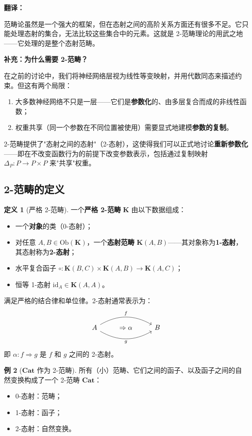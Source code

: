 \documentclass[12pt,a4paper]{ctexart}
\theoremstyle{definition}
\newtheorem{definition}{定义}[section]
\newtheorem{example}[definition]{例}
\newcommand{\cat}[1]{\mathbf{#1}}
\newcommand{\Cat}{\cat{Cat}}
\newcommand{\id}{\mathrm{id}}
\newcommand{\ob}[1]{\mathrm{Ob}(#1)}
\begin{document}
\textbf{翻译：}

范畴论虽然是一个强大的框架，但在态射之间的高阶关系方面还有很多不足。它只能处理态射的集合，无法比较这些集合中的元素。这就是 2-范畴理论的用武之地——它处理的是整个态射范畴。

\textbf{补充：为什么需要 2-范畴？}

在之前的讨论中，我们将神经网络层视为线性等变映射，并用代数同态来描述约束。但这有两个局限：
\begin{enumerate}[nosep]
    \item 大多数神经网络不只是一层——它们是\textbf{参数化}的、由多层复合而成的非线性函数；
    \item 权重共享（同一个参数在不同位置被使用）需要显式地建模\textbf{参数的复制}。
\end{enumerate}
2-范畴提供了"态射之间的态射"（2-态射），这使得我们可以正式地讨论\textbf{重新参数化}——即在不改变函数行为的前提下改变参数表示，包括通过复制映射 $\Delta_P:P\to P\times P$ 来"共享"权重。

\subsection{2-范畴的定义}

\begin{definition}[严格 2-范畴]\label{def:2-category}
一个\textbf{严格 2-范畴} $\cat K$ 由以下数据组成：
\begin{itemize}[nosep]
    \item 一个\textbf{对象}的类（0-态射）；
    \item 对任意 $A,B\in\ob{\cat K}$，一个\textbf{态射范畴} $\cat K(A,B)$——其对象称为\textbf{1-态射}，其态射称为\textbf{2-态射}；
    \item 水平复合函子 $\circ:\cat K(B,C)\times\cat K(A,B)\to\cat K(A,C)$；
    \item 恒等 1-态射 $\id_A\in\cat K(A,A)$。
\end{itemize}
满足严格的结合律和单位律。2-态射通常表示为：
\[
\begin{tikzcd}
A \arrow[rr,bend left,"f"] \arrow[rr,bend right,"g"'] & \Rightarrow\alpha & B
\end{tikzcd}
\]
即 $\alpha:f\Rightarrow g$ 是 $f$ 和 $g$ 之间的 2-态射。
\end{definition}

\begin{example}[$\Cat$ 作为 2-范畴]
所有（小）范畴、它们之间的函子、以及函子之间的自然变换构成了一个 2-范畴 $\Cat$：
\begin{itemize}[nosep]
    \item 0-态射：范畴；
    \item 1-态射：函子；
    \item 2-态射：自然变换。
\end{itemize}
\end{example}
\end{document}
